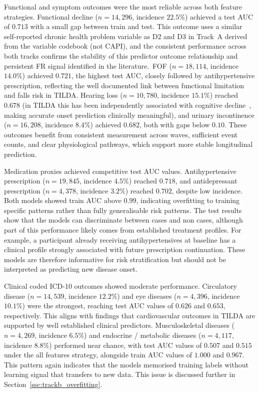 Functional and symptom outcomes were the most reliable across both feature strategies. Functional decline ($n = 14{,}296$, incidence $22.5\%$) achieved a test \gls{AUC} of $0.713$ with a small gap between train and test. This outcome uses a similar self-reported chronic health problem variable as D2 and D3 in Track~A derived from the variable codebook (not \gls{CAPI}), and the consistent performance across both tracks confirms the stability of this predictor outcome relationship and persistent \gls{FR} signal identified in the literature.\ \gls{FOF} ($n = 18{,}114$, incidence $14.0\%$) achieved $0.721$, the highest test \gls{AUC}, closely followed by antihypertensive prescription, reflecting the well documented link between functional limitation and falls risk in \gls{TILDA}. Hearing loss ($n = 10{,}780$, incidence $15.1\%$) reached $0.678$ (in \gls{TILDA} this has been independently associated with cognitive decline~\cite{cominettiProtectingCognitiveFunction2023}, making accurate onset prediction clinically meaningful), and urinary incontinence ($n = 16{,}208$, incidence $8.4\%$) achieved $0.682$, both with gaps below $0.10$. These outcomes benefit from consistent measurement across waves, sufficient event counts, and clear physiological pathways, which support more stable longitudinal prediction.

Medication proxies achieved competitive test \gls{AUC} values. Antihypertensive prescription ($n = 19{,}845$, incidence $4.5\%$) reached $0.718$, and antidepressant prescription ($n = 4{,}378$, incidence $3.2\%$) reached $0.702$, despite low incidence. Both models showed train \gls{AUC} above $0.99$, indicating overfitting to training specific patterns rather than fully generalisable risk patterns. The test results show that the models can discriminate between cases and non cases, although part of this performance likely comes from established treatment profiles. For example, a participant already receiving antihypertensives at baseline has a clinical profile strongly associated with future prescription continuation. These models are therefore informative for risk stratification but should not be interpreted as predicting new disease onset.

Clinical coded ICD-10 outcomes showed moderate performance. Circulatory disease ($n = 14{,}539$, incidence $12.2\%$) and eye diseases ($n = 4{,}396$, incidence $10.1\%$) were the strongest, reaching test \gls{AUC} values of $0.626$ and $0.653$, respectively. This aligns with findings that cardiovascular outcomes in \gls{TILDA} are supported by well established clinical predictors. Musculoskeletal diseases ($n = 4{,}269$, incidence $6.5\%$) and endocrine / metabolic diseases ($n = 4{,}117$, incidence $8.8\%$) performed near chance, with test \gls{AUC} values of $0.507$ and $0.515$ under the all features strategy, alongside train \gls{AUC} values of $1.000$ and $0.967$. This pattern again indicates that the models memorised training labels without learning signal that transfers to new data. This issue is discussed further in Section~\ref{ssc:trackb_overfitting}.

